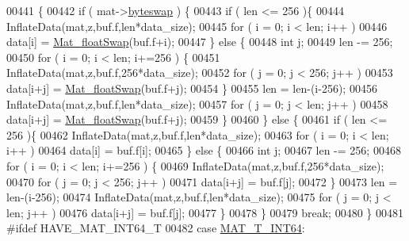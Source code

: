 \begin{DoxyCode}
00441         \{
00442             \textcolor{keywordflow}{if} ( mat->\hyperlink{struct__mat__t_a99d207977af5e04941ace56d71817a40}{byteswap} ) \{
00443                 \textcolor{keywordflow}{if} ( len <= 256 )\{
00444                     InflateData(mat,z,buf.f,len*data\_size);
00445                     \textcolor{keywordflow}{for} ( i = 0; i < len; i++ )
00446                         data[i] = \hyperlink{endian_8c_aec590b585dd84bbbae74a857922fced2}{Mat\_floatSwap}(buf.f+i);
00447                 \} \textcolor{keywordflow}{else} \{
00448                     \textcolor{keywordtype}{int} j;
00449                     len -= 256;
00450                     \textcolor{keywordflow}{for} ( i = 0; i < len; i+=256 ) \{
00451                         InflateData(mat,z,buf.f,256*data\_size);
00452                         \textcolor{keywordflow}{for} ( j = 0; j < 256; j++ )
00453                             data[i+j] = \hyperlink{endian_8c_aec590b585dd84bbbae74a857922fced2}{Mat\_floatSwap}(buf.f+j);
00454                     \}
00455                     len = len-(i-256);
00456                     InflateData(mat,z,buf.f,len*data\_size);
00457                     \textcolor{keywordflow}{for} ( j = 0; j < len; j++ )
00458                         data[i+j] = \hyperlink{endian_8c_aec590b585dd84bbbae74a857922fced2}{Mat\_floatSwap}(buf.f+j);
00459                 \}
00460             \} \textcolor{keywordflow}{else} \{
00461                 \textcolor{keywordflow}{if} ( len <= 256 )\{
00462                     InflateData(mat,z,buf.f,len*data\_size);
00463                     \textcolor{keywordflow}{for} ( i = 0; i < len; i++ )
00464                         data[i] = buf.f[i];
00465                 \} \textcolor{keywordflow}{else} \{
00466                     \textcolor{keywordtype}{int} j;
00467                     len -= 256;
00468                     \textcolor{keywordflow}{for} ( i = 0; i < len; i+=256 ) \{
00469                         InflateData(mat,z,buf.f,256*data\_size);
00470                         \textcolor{keywordflow}{for} ( j = 0; j < 256; j++ )
00471                             data[i+j] = buf.f[j];
00472                     \}
00473                     len = len-(i-256);
00474                     InflateData(mat,z,buf.f,len*data\_size);
00475                     \textcolor{keywordflow}{for} ( j = 0; j < len; j++ )
00476                         data[i+j] = buf.f[j];
00477                 \}
00478             \}
00479             \textcolor{keywordflow}{break};
00480         \}
00481 \textcolor{preprocessor}{#ifdef HAVE\_MAT\_INT64\_T}
00482         \textcolor{keywordflow}{case} \hyperlink{group___m_a_t_ggacf7b3b879282b7ab3a51190e49bf3453a9e825b5d18b8f946eaf2b4b57e51c145}{MAT\_T\_INT64}:

\end{DoxyCode}
